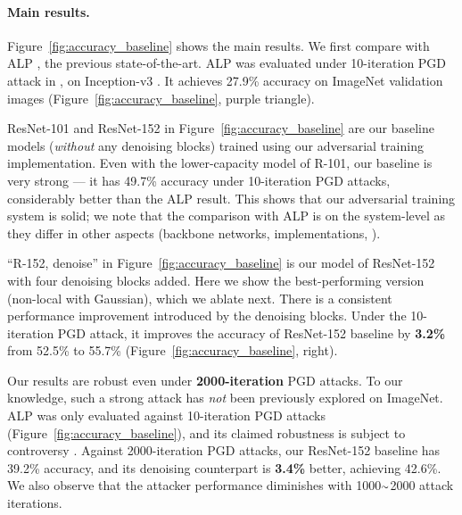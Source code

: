\documentclass[10pt,twocolumn,letterpaper]{article}
\newcommand{\app}{\raise.17ex\hbox{$\scriptstyle\sim$}}
\begin{document}
\paragraph{Main results.} Figure~\ref{fig:accuracy_baseline} shows the main results.
We first compare with ALP \cite{Kannan2018}, the previous state-of-the-art. ALP was evaluated under 10-iteration PGD attack in \cite{Kannan2018}, on Inception-v3 \cite{Szegedy2016a}. It achieves 27.9\% accuracy on ImageNet validation images (Figure~\ref{fig:accuracy_baseline}, purple triangle).

\begin{figure*}[t]
\centering
\vspace{-.5em}
\vspace{-1.5em}
\caption{\textbf{Defense against white-box attacks on ImageNet}. The left plot shows results against a white-box PGD attacker with 10 to \textbf{2000} attack iterations. The right plot zooms in on the results with 10 to 100 attack iterations.
The maximum perturbation is $\epsilon$ $=$ 16.
}
\label{fig:accuracy_baseline} 
\vspace{-.5em}
\end{figure*}


ResNet-101 and ResNet-152 in Figure~\ref{fig:accuracy_baseline} are our baseline models (\emph{without} any denoising blocks) trained using our adversarial training implementation. Even with the lower-capacity model of R-101, our baseline is very strong --- it has 49.7\% accuracy under 10-iteration PGD attacks, considerably better than the ALP result. This shows that our adversarial training system is solid; we note that the comparison with ALP is on the system-level as they differ in other aspects (backbone networks, implementations, \etc). 

``R-152, denoise'' in Figure~\ref{fig:accuracy_baseline} is our model of ResNet-152 with four denoising blocks added. Here we show the best-performing version (non-local with Gaussian), which we ablate next.  There is a consistent performance improvement introduced by the denoising blocks. Under the 10-iteration PGD attack, it improves the accuracy of ResNet-152 baseline by \textbf{3.2\%} from 52.5\% to 55.7\% (Figure~\ref{fig:accuracy_baseline}, right).

Our results are robust even under \textbf{2000-iteration} PGD attacks.
To our knowledge, such a strong attack has \emph{not} been previously explored on ImageNet.
ALP \cite{Kannan2018} was only evaluated against 10-iteration PGD attacks (Figure~\ref{fig:accuracy_baseline}), and its claimed robustness is subject to controversy \cite{Engstrom2018}.
Against 2000-iteration PGD attacks, our ResNet-152 baseline has 39.2\% accuracy, and its denoising counterpart is \textbf{3.4\%} better, achieving 42.6\%. We also observe that the attacker performance diminishes with 1000$\app$2000 attack iterations.
\end{document}
